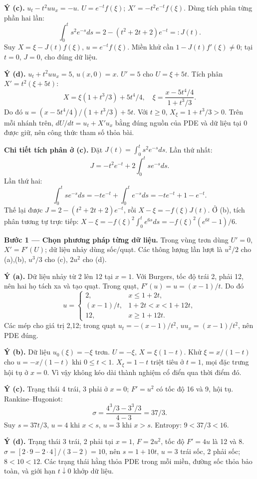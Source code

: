 \textbf{Ý (c).} $u_t-t^2uu_x=-u$. $U=e^{-t}f(\xi)$; $X'= -t^2e^{-t}f(\xi)$. Dùng tích phân từng phần hai lần:
\[\int_0^t s^2e^{-s}ds=2-(t^2+2t+2)e^{-t}=:J(t).\]
Suy $X=\xi-J(t)f(\xi)$, $u=e^{-t}f(\xi)$. Miền khử cần $1-J(t)f'(\xi)\ne0$; tại $t=0$, $J=0$, cho đúng dữ liệu.

\textbf{Ý (d).} $u_t+t^2uu_x=5$, $u(x,0)=x$. $U'=5$ cho $U=\xi+5t$. Tích phân $X'=t^2(\xi+5t)$:
\[X=\xi(1+t^3/3)+5t^4/4,\quad \xi=\frac{x-5t^4/4}{1+t^3/3}.\]
Do đó $u=(x-5t^4/4)/(1+t^3/3)+5t$. Với $t\ge0$, $X_\xi=1+t^3/3>0$. Trên mỗi nhánh trên, $dU/dt=u_t+X'u_x$ bằng đúng nguồn của PDE và dữ liệu tại 0 được giữ, nên công thức tham số thỏa bài.

\textbf{Chi tiết tích phân ở (c).} Đặt $J(t)=\int_0^t s^2e^{-s}ds$. Lần thứ nhất:
\[J=-t^2e^{-t}+2\int_0^t se^{-s}ds.\]
Lần thứ hai:
\[\int_0^t se^{-s}ds=-te^{-t}+\int_0^t e^{-s}ds=-te^{-t}+1-e^{-t}.\]
Thế lại được $J=2-(t^2+2t+2)e^{-t}$, rồi $X-\xi=-f(\xi)J(t)$. Ở (b), tích phân tương tự trực tiếp: $X-\xi=-f(\xi)^2\int_0^te^{6s}ds=-f(\xi)^2(e^{6t}-1)/6$.

\textbf{Bước 1 — Chọn phương pháp từng dữ liệu.} Trong vùng trơn dùng $U'=0$, $X'=F'(U)$; dữ liệu nhảy dùng sốc/quạt. Các thông lượng lần lượt là $u^2/2$ cho (a),(b), $u^3/3$ cho (c), $2u^2$ cho (d).

\textbf{Ý (a).} Dữ liệu nhảy từ 2 lên 12 tại $x=1$. Với Burgers, tốc độ trái 2, phải 12, nên hai họ tách xa và tạo quạt. Trong quạt, $F'(u)=u=(x-1)/t$. Do đó
\[u=\begin{cases}2,&x\le1+2t,\\(x-1)/t,&1+2t<x<1+12t,\\12,&x\ge1+12t.\end{cases}\]
Các mép cho giá trị 2,12; trong quạt $u_t=-(x-1)/t^2$, $uu_x=(x-1)/t^2$, nên PDE đúng.

\textbf{Ý (b).} Dữ liệu $u_0(\xi)=-\xi$ trơn. $U=-\xi$, $X=\xi(1-t)$. Khử $\xi=x/(1-t)$ cho $u=-x/(1-t)$ khi $0\le t<1$. $X_\xi=1-t$ triệt tiêu ở $t=1$, mọi đặc trưng hội tụ ở $x=0$. Vì vậy không kéo dài thành nghiệm cổ điển qua thời điểm đó.

\textbf{Ý (c).} Trạng thái 4 trái, 3 phải ở $x=0$; $F'=u^2$ có tốc độ 16 và 9, hội tụ. Rankine–Hugoniot:
\[\sigma=\frac{4^3/3-3^3/3}{4-3}=37/3.\]
Suy $s=37t/3$, $u=4$ khi $x<s$, $u=3$ khi $x>s$. Entropy: $9<37/3<16$.

\textbf{Ý (d).} Trạng thái 3 trái, 2 phải tại $x=1$, $F=2u^2$, tốc độ $F'=4u$ là 12 và 8. $\sigma=[2\cdot9-2\cdot4]/(3-2)=10$, nên $s=1+10t$, $u=3$ trái sốc, 2 phải sốc; $8<10<12$. Các trạng thái hằng thỏa PDE trong mỗi miền, đường sốc thỏa bảo toàn, và giới hạn $t\downarrow0$ khớp dữ liệu.

